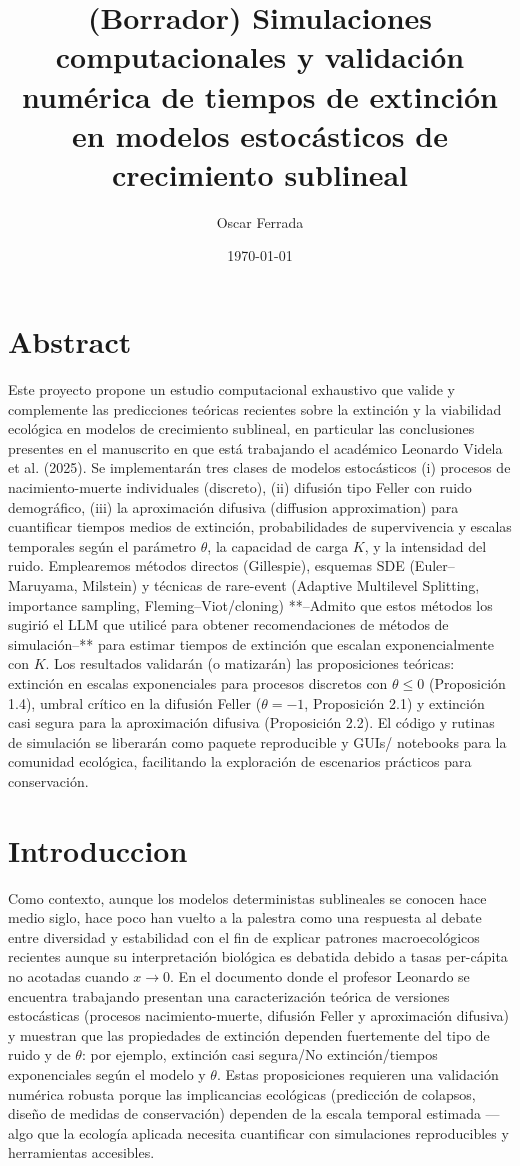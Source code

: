 \documentclass[12pt,]{article}
\title{(Borrador) Simulaciones computacionales y validación numérica de tiempos de extinción en modelos estocásticos de crecimiento sublineal}
\author[1]{Oscar Ferrada}
\affil[1]{Leonardo Videla}
\date{\today}
\begin{document}
\maketitle


\newpage
\section*{Abstract}
Este proyecto propone un estudio computacional exhaustivo que valide y complemente las predicciones teóricas recientes sobre la extinción y la viabilidad ecológica en modelos de crecimiento sublineal, en particular las conclusiones presentes en el manuscrito en que está trabajando el académico Leonardo Videla et al. (2025). 
Se implementarán tres clases de modelos estocásticos 
(i) procesos de nacimiento-muerte individuales (discreto), 
(ii) difusión tipo Feller con ruido demográfico,
(iii) la aproximación difusiva (diffusion approximation)
para cuantificar tiempos medios de extinción, probabilidades de supervivencia y escalas temporales según el parámetro $\theta$, la capacidad de carga $K$, y la intensidad del ruido. 
Emplearemos métodos directos (Gillespie), esquemas SDE (Euler–Maruyama, Milstein) y técnicas de rare-event (Adaptive Multilevel Splitting, importance sampling, Fleming–Viot/cloning) **--Admito que estos métodos los sugirió el LLM que utilicé para obtener recomendaciones de métodos de simulación--** para estimar tiempos de extinción que escalan exponencialmente con $K$. 
Los resultados validarán (o matizarán) las proposiciones teóricas: extinción en escalas exponenciales para procesos discretos con $\theta\le 0$ (Proposición 1.4), umbral crítico en la difusión Feller ($\theta=-1$, Proposición 2.1) y extinción casi segura para la aproximación difusiva (Proposición 2.2). El código y rutinas de simulación se liberarán como paquete reproducible y GUIs/ notebooks para la comunidad ecológica, facilitando la exploración de escenarios prácticos para conservación.
\newpage

\section{Introduccion}
Como contexto, aunque los modelos deterministas sublineales se conocen hace medio siglo, hace poco han vuelto a la palestra como una respuesta al debate entre diversidad y estabilidad con el fin de explicar patrones macroecológicos recientes aunque su interpretación biológica es debatida debido a tasas per-cápita no acotadas cuando $x\to0$. En el documento donde el profesor Leonardo se encuentra trabajando presentan una caracterización teórica de versiones estocásticas (procesos nacimiento-muerte, difusión Feller y aproximación difusiva) y muestran que las propiedades de extinción dependen fuertemente del tipo de ruido y de $\theta$: por ejemplo, extinción casi segura/No extinción/tiempos exponenciales según el modelo y $\theta$. Estas proposiciones requieren una validación numérica robusta porque las implicancias ecológicas (predicción de colapsos, diseño de medidas de conservación) dependen de la escala temporal estimada —algo que la ecología aplicada necesita cuantificar con simulaciones reproducibles y herramientas accesibles.
\end{document}
